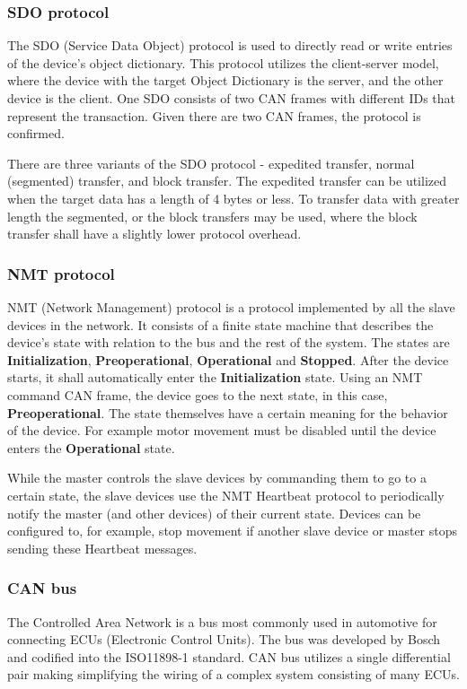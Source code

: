 \subsubsection{SDO protocol}
The SDO (Service Data Object) protocol is used to directly read or write entries of the device's object dictionary.
This protocol utilizes the client-server model, where the device with the target Object Dictionary is the server, and the other device is the client.
One SDO consists of two CAN frames with different IDs that represent the transaction.
Given there are two CAN frames, the protocol is confirmed\cite{can_in_automation_can_2021}.

There are three variants of the SDO protocol - expedited transfer, normal (segmented) transfer, and block transfer.
The expedited transfer can be utilized when the target data has a length of 4 bytes or less.
To transfer data with greater length the segmented, or the block transfers may be used, where the block transfer shall have a slightly lower protocol overhead\cite{noauthor_canopen_2021}.

\subsubsection{NMT protocol}
NMT (Network Management) protocol is a protocol implemented by all the slave devices in the network.
It consists of a finite state machine that describes the device's state with relation to the bus and the rest of the system.
The states are \textbf{Initialization}, \textbf{Preoperational}, \textbf{Operational} and \textbf{Stopped}.
After the device starts, it shall automatically enter the \textbf{Initialization} state.
Using an NMT command CAN frame, the device goes to the next state, in this case, \textbf{Preoperational}.
The state themselves have a certain meaning for the behavior of the device.
For example motor movement must be disabled until the device enters the \textbf{Operational} state.

While the master controls the slave devices by commanding them to go to a certain state, the slave devices use the NMT Heartbeat protocol to periodically notify the master (and other devices) of their current state.
Devices can be configured to, for example, stop movement if another slave device or master stops sending these Heartbeat messages.

\subsubsection{CAN bus}
The Controlled Area Network is a bus most commonly used in automotive for connecting ECUs (Electronic Control Units).
The bus was developed by Bosch and codified into the ISO11898-1 standard.
CAN bus utilizes a single differential pair making simplifying the wiring of a complex system consisting of many ECUs\cite{st_michael_introduction_2019}.


